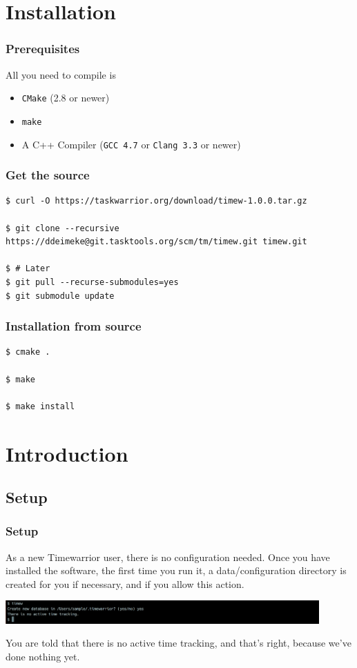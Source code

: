 \documentclass[t,handout]{beamer}
\begin{document}
\section{Installation}

\begin{frame}[fragile]\frametitle{Prerequisites}
    \vfill
    All you need to compile is
    \begin{itemize}
        \item \verb+CMake+ (2.8 or newer)
        \item \verb+make+
        \item A C++ Compiler (\verb+GCC 4.7+ or \verb+Clang 3.3+ or newer)
    \end{itemize}
\end{frame}

\begin{frame}[fragile]\frametitle{Get the source}
    \vfill
    \begin{lstlisting}
$ curl -O https://taskwarrior.org/download/timew-1.0.0.tar.gz

$ git clone --recursive https://ddeimeke@git.tasktools.org/scm/tm/timew.git timew.git

$ # Later
$ git pull --recurse-submodules=yes
$ git submodule update\end{lstlisting}
\end{frame}

\begin{frame}[fragile]\frametitle{Installation from source}
    \vfill
    \begin{lstlisting}
$ cmake .

$ make

$ make install\end{lstlisting}
\end{frame}

\section{Introduction}

\subsection{Setup}

\begin{frame}[fragile]\frametitle{Setup}
    As a new Timewarrior user, there is no configuration needed. Once you have installed the software, the first time you run it, a data/configuration directory is created for you if necessary, and if you allow this action.

    \includegraphics[width=12cm]{images/tutorial1.png}

    You are told that there is no active time tracking, and that's right, because we've done nothing yet.
\end{frame}
\end{document}
